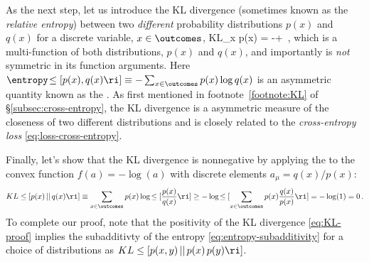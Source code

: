 {As the next step, let us introduce the KL divergence (sometimes known as the \emph{relative entropy}) between two \emph{different} probability distributions $p(x)$ and $q(x)$ for a discrete variable, $x \in \outcomes$,
\be\label{eq:KL-divergence-def}
KL\le[ p(x) \, ||\, q(x) \ri] \equiv\sum_{x \in \outcomes} p(x) \log \!\le[\frac{p(x)}{q(x)} \ri] 
= -\entropy\!\le[p(x)\ri]+\entropy\!\le[p(x), q(x)\ri]
\, ,
\ee
which is a multi-function  of both distributions, $p(x)$ and $q(x)$, and importantly is \emph{not} symmetric in its function arguments. Here $\entropy\!\le[p(x), q(x)\ri]\equiv - \sum_{x \in \outcomes} p(x) \log q(x) $ is an asymmetric quantity known as the . As first mentioned in footnote~\ref{footnote:KL} of \S\ref{subsec:cross-entropy}, the KL divergence is a asymmetric measure of the closeness of two different distributions and is closely related to the \emph{cross-entropy loss} \eqref{eq:loss-cross-entropy}.


Finally, let's show that the KL divergence is nonnegative by applying the  to the convex function $f(a)=-\log(a)$ with discrete elements $a_\mu=q(x)/p(x)$:
\begin{align}\label{eq:KL-proof}
KL\le[ p(x) \, ||\, q(x) \ri]\equiv\sum_{x\in \outcomes} p(x) \log\!\le[\frac{p(x)}{q(x)} \ri]\geq - \log\!\le[\sum_{x\in \outcomes} p(x)\frac{q(x)}{p(x)} \ri]
=-\log(1)=0\, .
\end{align}
To complete our proof, note that the positivity of the KL divergence \eqref{eq:KL-proof} implies the subadditivty  of the entropy \eqref{eq:entropy-subadditivity} for a choice of distributions as $KL\le[ p(x,y) \, ||\, p(x)\,p(y) \ri]$.
} %




